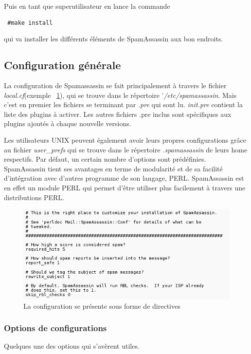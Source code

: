 \documentclass[a4paper,11pt]{article}
\begin{document}
Puis en tant que superutilisateur en lance la commande 
\begin{lstlisting}
 #make install
\end{lstlisting}
 qui va installer les différents éléments de SpamAssassin aux bon endroits.
\subsection{Configuration générale}

La configuration de Spamassassin se fait principalement à travers le fichier \emph{local.cf}(exemple ~\ref{fig:local_sample}), qui se trouve dans le 
répertoire '\emph{/etc/spamassassin}. Mais c'est en premier les fichiers se terminant par \emph{.pre} qui sont lu. \emph{init.pre} contient la liste des plugins à activer.
Les autres fichiers .pre inclus sont spécifiques aux plugins ajoutés à chaque nouvelle versions.

Les utilisateurs UNIX peuvent également avoir leurs propres configurations grâce au fichier \emph{user\_prefs}
qui se trouve dans le répertoire \emph{.spamassassin} de leurs home respectifs. 
Par défaut, un certain nombre d’options sont prédéfinies. 
\linebreak
SpamAssassin tient ses avantages en terme de modularité et de sa facilité d'intégration avec d'autres programme de son langage, PERL.
SpamAssassin est en effet un module PERL qui permet d'être utiliser plus facilement à travers une distributions PERL. 

\begin{figure}[h!]
 \centering
 \includegraphics[width=\textwidth]{./annexes/local_sample.png}
 \caption{La configuration se présente sous forme de directives}
 \label{fig:local_sample}
\end{figure}
\pagebreak
\subsubsection{Options de configurations}
Quelques une des options qui s'avèrent utiles.
\end{document}
